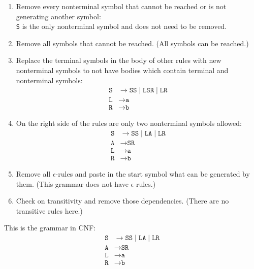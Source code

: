 \documentclass[a4paper, 11pt]{article}
\begin{document}
\begin{enumerate}

\item Remove every nonterminal symbol that cannot be reached or is not generating another symbol: \\
\texttt{S} is the only nonterminal symbol and does not need to be removed.

\item Remove all symbols that cannot be reached. (All symbols can be reached.)

\item Replace the terminal symbols in the body of other rules with new nonterminal symbols to not have bodies which contain terminal and nonterminal symbols:
\begin{align*}
\texttt{S} & \rightarrow \texttt{SS} \mid  \texttt{LSR} \mid \texttt{LR}  \\
\texttt{L} & \rightarrow \texttt{a} \\
\texttt{R} & \rightarrow \texttt{b} 
\end{align*}


\item On the right side of the rules are only two nonterminal symbols allowed:
\begin{align*}
\texttt{S} & \rightarrow \texttt{SS} \mid  \texttt{LA} \mid \texttt{LR}  \\
\texttt{A} & \rightarrow \texttt{SR} \\
\texttt{L} & \rightarrow \texttt{a} \\
\texttt{R} & \rightarrow \texttt{b} 
\end{align*}

\item Remove all $\epsilon$-rules and paste in the start symbol what can be generated by them. (This grammar does not have $\epsilon$-rules.)

\item Check on transitivity and remove those dependencies. (There are no transitive rules here.)

\end{enumerate}

This is the grammar in CNF:
\begin{align*}
\texttt{S} & \rightarrow \texttt{SS} \mid  \texttt{LA} \mid \texttt{LR}  \\
\texttt{A} & \rightarrow \texttt{SR} \\
\texttt{L} & \rightarrow \texttt{a} \\
\texttt{R} & \rightarrow \texttt{b} 
\end{align*}
\end{document}
